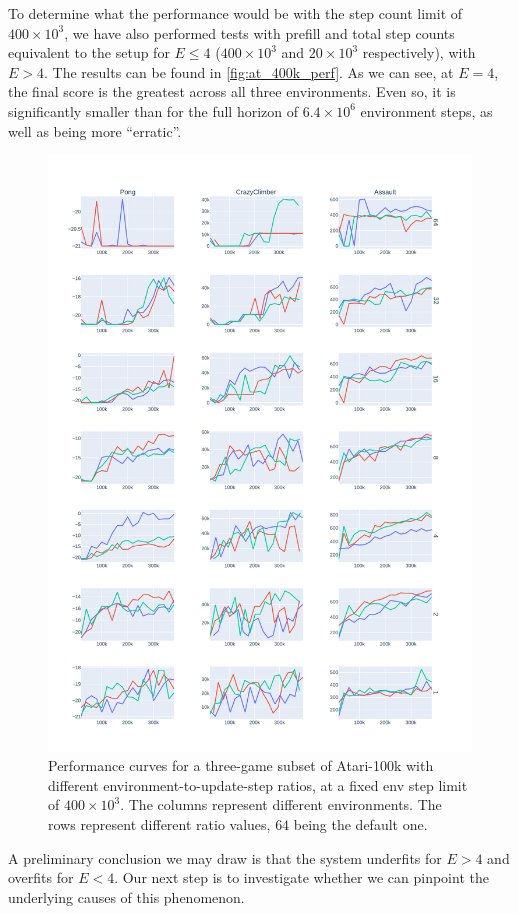 \documentclass[twoside,11pt]{article}
\begin{document}
To determine what the performance would be with the step count limit of $400 \times 10^3$, we have also performed tests with prefill and total step counts equivalent to the setup for $E \leq 4$ ($400 \times 10^3$ and $20 \times 10^3$ respectively), with $E > 4$. The results can be found in \autoref{fig:at_400k_perf}. As we can see, at $E = 4$, the final score is the greatest across all three environments. Even so, it is significantly smaller than for the full horizon of $6.4 \times 10^6$ environment steps, as well as being more ``erratic''.

\begin{figure}
  \centering
  \includegraphics[width=0.8\linewidth,height=0.8\paperheight,keepaspectratio]{assets/at_400k.perf.pdf}
  \caption{Performance curves for a three-game subset of Atari-100k with different environment-to-update-step ratios, at a fixed env step limit of $400 \times 10^3$. The columns represent different environments. The rows represent different ratio values, $64$ being the default one.}
  \label{fig:at_400k_perf}
\end{figure}

A preliminary conclusion we may draw is that the system underfits for $E > 4$ and overfits for $E < 4$. Our next step is to investigate whether we can pinpoint the underlying causes of this phenomenon.
\end{document}
